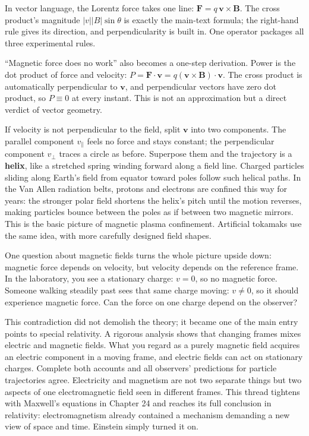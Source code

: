 \begin{mathbridge}
In vector language, the Lorentz force takes one line: \(\bm F=q\,\bm v\times\bm B\). The cross product's magnitude \(|v||B|\sin\theta\) is exactly the main-text formula; the right-hand rule gives its direction, and perpendicularity is built in. One operator packages all three experimental rules.

``Magnetic force does no work'' also becomes a one-step derivation. Power is the dot product of force and velocity: \(P=\bm F\cdot\bm v=q(\bm v\times\bm B)\cdot\bm v\). The cross product is automatically perpendicular to \(\bm v\), and perpendicular vectors have zero dot product, so \(P\equiv0\) at every instant. This is not an approximation but a direct verdict of vector geometry.

If velocity is not perpendicular to the field, split \(\bm v\) into two components. The parallel component \(v_{\parallel}\) feels no force and stays constant; the perpendicular component \(v_{\perp}\) traces a circle as before. Superpose them and the trajectory is a \textbf{helix}, like a stretched spring winding forward along a field line. Charged particles sliding along Earth's field from equator toward poles follow such helical paths. In the Van Allen radiation belts, protons and electrons are confined this way for years: the stronger polar field shortens the helix's pitch until the motion reverses, making particles bounce between the poles as if between two magnetic mirrors. This is the basic picture of magnetic plasma confinement. Artificial tokamaks use the same idea, with more carefully designed field shapes.
\end{mathbridge}

\begin{challenge}
One question about magnetic fields turns the whole picture upside down: magnetic force depends on velocity, but velocity depends on the reference frame. In the laboratory, you see a stationary charge: \(v=0\), so no magnetic force. Someone walking steadily past sees that same charge moving: \(v\neq0\), so it should experience magnetic force. Can the force on one charge depend on the observer?

This contradiction did not demolish the theory; it became one of the main entry points to special relativity. A rigorous analysis shows that changing frames mixes electric and magnetic fields. What you regard as a purely magnetic field acquires an electric component in a moving frame, and electric fields can act on stationary charges. Complete both accounts and all observers' predictions for particle trajectories agree. Electricity and magnetism are not two separate things but two aspects of one electromagnetic field seen in different frames. This thread tightens with Maxwell's equations in Chapter 24 and reaches its full conclusion in relativity: electromagnetism already contained a mechanism demanding a new view of space and time. Einstein simply turned it on.
\end{challenge}

